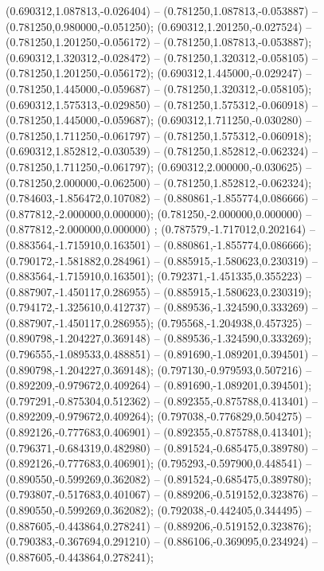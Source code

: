  (0.690312,1.087813,-0.026404) -- (0.781250,1.087813,-0.053887) -- (0.781250,0.980000,-0.051250);
 (0.690312,1.201250,-0.027524) -- (0.781250,1.201250,-0.056172) -- (0.781250,1.087813,-0.053887);
 (0.690312,1.320312,-0.028472) -- (0.781250,1.320312,-0.058105) -- (0.781250,1.201250,-0.056172);
 (0.690312,1.445000,-0.029247) -- (0.781250,1.445000,-0.059687) -- (0.781250,1.320312,-0.058105);
 (0.690312,1.575313,-0.029850) -- (0.781250,1.575312,-0.060918) -- (0.781250,1.445000,-0.059687);
 (0.690312,1.711250,-0.030280) -- (0.781250,1.711250,-0.061797) -- (0.781250,1.575312,-0.060918);
 (0.690312,1.852812,-0.030539) -- (0.781250,1.852812,-0.062324) -- (0.781250,1.711250,-0.061797);
 (0.690312,2.000000,-0.030625) -- (0.781250,2.000000,-0.062500) -- (0.781250,1.852812,-0.062324);
 (0.784603,-1.856472,0.107082) -- (0.880861,-1.855774,0.086666) -- (0.877812,-2.000000,0.000000);
 (0.781250,-2.000000,0.000000) -- (0.877812,-2.000000,0.000000) ;
 (0.787579,-1.717012,0.202164) -- (0.883564,-1.715910,0.163501) -- (0.880861,-1.855774,0.086666);
 (0.790172,-1.581882,0.284961) -- (0.885915,-1.580623,0.230319) -- (0.883564,-1.715910,0.163501);
 (0.792371,-1.451335,0.355223) -- (0.887907,-1.450117,0.286955) -- (0.885915,-1.580623,0.230319);
 (0.794172,-1.325610,0.412737) -- (0.889536,-1.324590,0.333269) -- (0.887907,-1.450117,0.286955);
 (0.795568,-1.204938,0.457325) -- (0.890798,-1.204227,0.369148) -- (0.889536,-1.324590,0.333269);
 (0.796555,-1.089533,0.488851) -- (0.891690,-1.089201,0.394501) -- (0.890798,-1.204227,0.369148);
 (0.797130,-0.979593,0.507216) -- (0.892209,-0.979672,0.409264) -- (0.891690,-1.089201,0.394501);
 (0.797291,-0.875304,0.512362) -- (0.892355,-0.875788,0.413401) -- (0.892209,-0.979672,0.409264);
 (0.797038,-0.776829,0.504275) -- (0.892126,-0.777683,0.406901) -- (0.892355,-0.875788,0.413401);
 (0.796371,-0.684319,0.482980) -- (0.891524,-0.685475,0.389780) -- (0.892126,-0.777683,0.406901);
 (0.795293,-0.597900,0.448541) -- (0.890550,-0.599269,0.362082) -- (0.891524,-0.685475,0.389780);
 (0.793807,-0.517683,0.401067) -- (0.889206,-0.519152,0.323876) -- (0.890550,-0.599269,0.362082);
 (0.792038,-0.442405,0.344495) -- (0.887605,-0.443864,0.278241) -- (0.889206,-0.519152,0.323876);
 (0.790383,-0.367694,0.291210) -- (0.886106,-0.369095,0.234924) -- (0.887605,-0.443864,0.278241);
